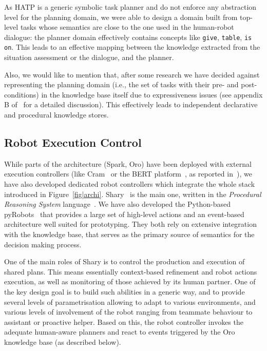 \documentclass[preprint,3p,times]{elsarticle}
\newcommand{\ie}{i.e.\xspace}
\begin{document}
As HATP is a generic symbolic task planner and do not enforce any abstraction
level for the planning domain, we were able to design a domain built from
top-level tasks whose semantics are close to the one used in the human-robot
dialogue: the planner domain effectively contains concepts like \texttt{give},
\texttt{table}, \texttt{is on}. This leads to an effective mapping between the
knowledge extracted from the situation assessment or the dialogue, and the
planner.

Also, we would like to mention that, after some research we have decided against
representing the planning domain (\ie, the set of tasks with their pre- and
post-conditions) in the knowledge base itself due to expressiveness issues (see
appendix B of~\cite{Lemaignan2012a} for a detailed discussion). This effectively
leads to independent declarative and procedural knowledge stores.

\subsection{Robot Execution Control}
\label{sect|ctrl}

While parts of the architecture ({\sc Spark}, {\sc Oro}) have been deployed with
external execution controllers (like {\sc Cram}~\cite{Beetz2010} or the BERT
platform~\cite{Lallee2010b}, as reported in~\cite{Lemaignan2010}), we have also
developed dedicated robot controllers which integrate the whole stack introduced
in Figure~\ref{fig|archi}. {\sc Shary}~\cite{clodic2008shary} is the main one,
written in the \emph{Procedural Reasoning System} language~\cite{Ingrand1996}.
We have also developed the Python-based {\sc pyRobots}~\cite{lemaignan2015pyrobots} that
provides a large set of high-level actions and an event-based architecture well
suited for prototyping. They both rely on extensive integration with the knowledge
base, that serves as the primary source of semantics for the decision making process.

One of the main roles of {\sc Shary} is to control the production and execution
of shared plans. This means essentially context-based refinement and robot
actions execution, as well as monitoring of those achieved by its human
partner. One of the key design goal is to build such abilities in a generic
way, and to provide several levels of parametrisation allowing to adapt to
various environments, and various levels of involvement of the robot ranging
from teammate behaviour to assistant or proactive helper. Based on this,
the robot controller invokes the adequate human-aware planners and react to
events triggered by the {\sc Oro} knowledge base (as described below).
\end{document}
